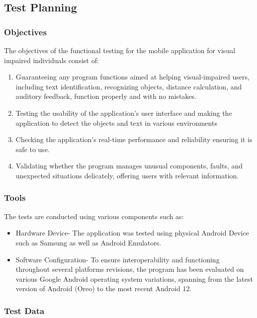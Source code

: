 \documentclass[MScCS]{uccthesis}
\begin{document}
\subsection{Test Planning}
\subsubsection{Objectives}
The objectives of the functional testing for the mobile application for visual impaired individuals consist of:
\begin{enumerate}
    \item Guaranteeing any program functions aimed at helping visual-impaired users, including text identification, recognizing objects, distance calculation, and auditory feedback, function properly and with no mistakes.
    \item Testing the usability of the application's user interface and making the application to detect the objects and text in various environments
    \item Checking the application's real-time performance and reliability ensuring it is safe to use.
    \item Validating whether the program manages unusual components, faults, and unexpected situations delicately, offering users with relevant information.
\end{enumerate}

\subsubsection{Tools}
 The tests are conducted using various components such as:
 \begin{itemize}
     \item Hardware Device- The application was tested using physical Android Device such as Samsung as well as Android Emulators.
     \item Software Configuration- To ensure interoperability and functioning throughout several platforms revisions, the program has been evaluated on various Google Android operating system variations, spanning from the latest version of Android (Oreo) to the most recent Android 12.

 \end{itemize}

 \subsubsection{Test Data}
\end{document}
